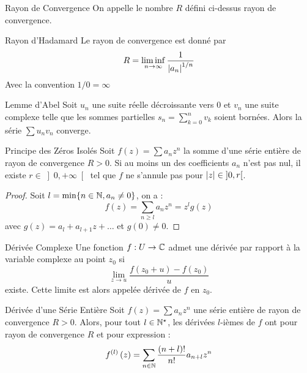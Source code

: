 \documentclass{cours}
\begin{document}
\begin{définition}{Rayon de Convergence}{}
    On appelle le nombre $R$ défini ci-dessus rayon de convergence.
\end{définition}

\begin{propositionfr}{Rayon d'Hadamard}{}
    Le rayon de convergence est donné par 
    \begin{equation*}
        R = \liminf_{n \to \infty}\frac{1}{\left|a_{n}\right|^{1/n}}
    \end{equation*}
    Avec la convention $1/0 = \infty$
\end{propositionfr}

\begin{lemme}{Lemme d'Abel}{}
    Soit $u_{n}$ une suite réelle décroissante vers $0$ et $v_{n}$ une suite complexe telle que les sommes partielles $s_{n} = \sum_{k = 0}^{n} v_{k}$ soient bornées. Alors la série $\sum u_{n}v_{n}$ converge.
\end{lemme}

\begin{propositionfr}{Principe des Zéros Isolés}{}
    Soit $f\left(z\right) = \sum a_{n}z^{n}$ la somme d'une série entière de rayon de convergence $R > 0$. Si au moins un des coefficients $a_{n}$ n'est pas nul, il existe $r \in \left] 0, +\infty\right[$ tel que $f$ ne s'annule pas pour $\left|z\right| \in \left]0, r\right[$.
\end{propositionfr}
\begin{proof}
    Soit $l = \min \{n \in \mathbb{N}, a_{n} \neq 0\}$, on a : 
    \begin{equation*}
        f\left(z\right) = \sum_{n \geq l} a_{n}z^{n} = z^{l}g\left(z\right)
    \end{equation*}
    avec $g\left(z\right) = a_{l} + a_{l + 1}z + \ldots$ et $g\left(0\right) \neq 0$. 
\end{proof}

\begin{définition}{Dérivée Complexe}{}
    Une fonction $f : U \to \mathbb{C}$ admet une dérivée par rapport à la variable complexe au point $z_{0}$ si
    \begin{equation*}
        \lim_{z \to u} \frac{f\left(z_{0} + u\right)- f\left(z_{0}\right)}{u}
    \end{equation*}
    existe. Cette limite est alors appelée dérivée de $f$ en $z_{0}$.
\end{définition}

\begin{propositionfr}{Dérivée d'une Série Entière}{}
    Soit $f\left(z\right) = \sum a_{n}z^{n}$ une série entière de rayon de convergence $R > 0$. Alors, pour tout $l \in \mathbb{N}^{\star}$, les dérivées $l$-ièmes de $f$ ont pour rayon de convergence $R$ et pour expression : 
    \begin{equation*}
        f^{\left(l\right)}\left(z\right) = \sum_{n \in \mathbb{N}}\frac{\left(n + l\right)!}{n!}a_{n + l}z^{n}  
    \end{equation*}
\end{propositionfr}
\end{document}
